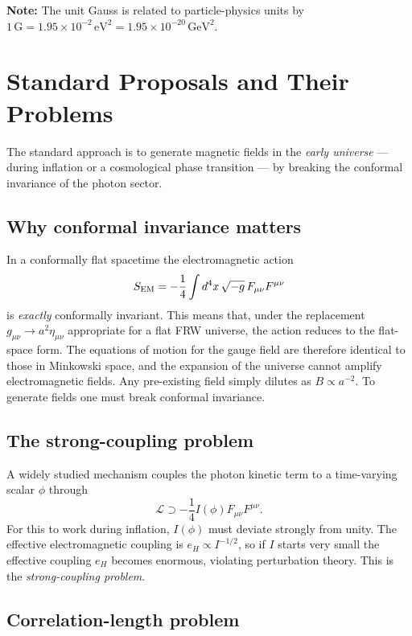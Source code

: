 \documentclass[12pt,a4paper,openany]{book}
\newcommand{\Fmn}{F_{\mu\nu}}
\newcommand{\Fmnu}{F^{\mu\nu}}
\begin{document}
\medskip
\noindent\textbf{Note:} The unit Gauss is related to particle-physics units by
$1\,\mathrm{G} = 1.95\times10^{-2}\,\mathrm{eV}^2 = 1.95\times10^{-20}\,\mathrm{GeV}^2$.

\section{Standard Proposals and Their Problems}

The standard approach is to generate magnetic fields in the \emph{early universe} — during inflation or a cosmological phase transition — by breaking the conformal invariance of the photon sector.

\subsection*{Why conformal invariance matters}

In a conformally flat spacetime the electromagnetic action
\begin{equation}
  S_{\rm EM} = -\frac{1}{4}\int d^4x\,\sqrt{-g}\,\Fmn\Fmnu
\end{equation}
is \emph{exactly} conformally invariant. This means that, under the replacement $g_{\mu\nu}\to a^2\eta_{\mu\nu}$ appropriate for a flat FRW universe, the action reduces to the flat-space form. The equations of motion for the gauge field are therefore identical to those in Minkowski space, and the expansion of the universe cannot amplify electromagnetic fields. Any pre-existing field simply dilutes as $B\propto a^{-2}$. To generate fields one must break conformal invariance.

\subsection*{The strong-coupling problem}

A widely studied mechanism couples the photon kinetic term to a time-varying scalar $\phi$ through
\begin{equation}
  \mathcal{L} \supset -\frac{1}{4}I(\phi)\Fmn\Fmnu.
\end{equation}
For this to work during inflation, $I(\phi)$ must deviate strongly from unity. The effective electromagnetic coupling is $e_H \propto I^{-1/2}$, so if $I$ starts very small the effective coupling $e_H$ becomes enormous, violating perturbation theory. This is the \emph{strong-coupling problem}.

\subsection*{Correlation-length problem}
\end{document}
